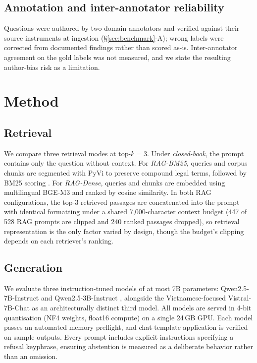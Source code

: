 \documentclass[conference,a4paper]{IEEEtran}
\begin{document}
\subsection{Annotation and inter-annotator reliability}
Questions were authored by two domain annotators and verified against their source instruments at ingestion (\S\ref{sec:benchmark}-A); wrong labels were corrected from documented findings rather than scored as-is. Inter-annotator agreement on the gold labels was not measured, and we state the resulting author-bias risk as a limitation.

\section{Method}
\label{sec:method}

\subsection{Retrieval}
We compare three retrieval modes at top-$k=3$. Under \emph{closed-book}, the prompt contains only the question without context. For \emph{RAG-BM25}, queries and corpus chunks are segmented with PyVi \cite{pyvi} to preserve compound legal terms, followed by BM25 scoring \cite{robertson2009bm25,rankbm25}. For \emph{RAG-Dense}, queries and chunks are embedded using multilingual BGE-M3 \cite{chen2024m3} and ranked by cosine similarity. In both RAG configurations, the top-3 retrieved passages are concatenated into the prompt with identical formatting under a shared 7{,}000-character context budget (447 of 528 RAG prompts are clipped and 240 ranked passages dropped), so retrieval representation is the only factor varied by design, though the budget's clipping depends on each retriever's ranking.

\subsection{Generation}
We evaluate three instruction-tuned models of at most 7B parameters: Qwen2.5-7B-Instruct and Qwen2.5-3B-Instruct \cite{yang2024qwen25}, alongside the Vietnamese-focused Vistral-7B-Chat \cite{nguyen2023vistral} as an architecturally distinct third model. All models are served in 4-bit quantisation (NF4 weights, float16 compute) on a single 24\,GB GPU. Each model passes an automated memory preflight, and chat-template application is verified on sample outputs. Every prompt includes explicit instructions specifying a refusal keyphrase, ensuring abstention is measured as a deliberate behavior rather than an omission.
\end{document}

